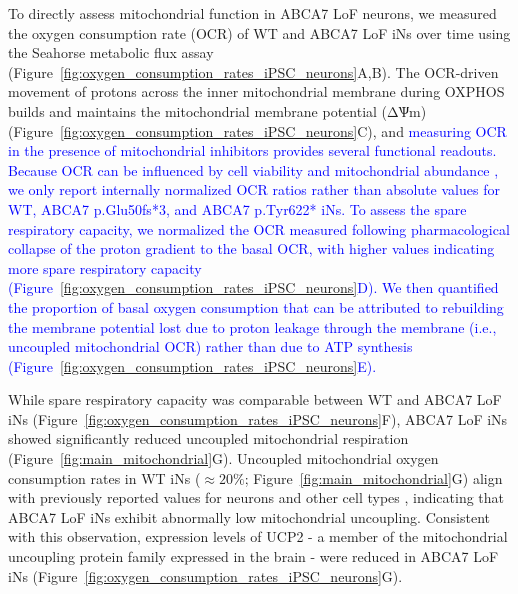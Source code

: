 To directly assess mitochondrial function in ABCA7 LoF neurons, we measured the oxygen consumption rate (OCR) of WT and ABCA7 LoF iNs over time using the Seahorse metabolic flux assay (Figure~\ref{fig:oxygen_consumption_rates_iPSC_neurons}A,B). The OCR-driven movement of protons across the inner mitochondrial membrane during OXPHOS builds and maintains the mitochondrial membrane potential (ΔѰm)(Figure~\ref{fig:oxygen_consumption_rates_iPSC_neurons}C), and  \newcommand{\quoteC}{\textcolor{blue}{measuring OCR in the presence of mitochondrial inhibitors provides several functional readouts. Because OCR can be influenced by cell viability and mitochondrial abundance \cite{Divakaruni2014-eq,Gu2021-ms}, we only report internally normalized OCR ratios rather than absolute values \cite{Divakaruni2022-bp} for WT, ABCA7 p.Glu50fs*3, and ABCA7 p.Tyr622* iNs. To assess the spare respiratory capacity, we normalized the OCR measured following pharmacological collapse of the proton gradient to the basal OCR, with higher values indicating more spare respiratory capacity \cite{Divakaruni2022-bp} (Figure~\ref{fig:oxygen_consumption_rates_iPSC_neurons}D). We then quantified the proportion of basal oxygen consumption that can be attributed to rebuilding the membrane potential lost due to proton leakage through the membrane (i.e., uncoupled mitochondrial OCR) rather than due to ATP synthesis \cite{Divakaruni2022-bp} (Figure~\ref{fig:oxygen_consumption_rates_iPSC_neurons}E).\label{quoteC-label}}}
\quoteC

While spare respiratory capacity was comparable between WT and ABCA7 LoF iNs (Figure~\ref{fig:oxygen_consumption_rates_iPSC_neurons}F), ABCA7 LoF iNs showed significantly reduced uncoupled mitochondrial respiration (Figure~\ref{fig:main_mitochondrial}G). Uncoupled mitochondrial oxygen consumption rates in WT iNs ($\approx 20\%$; Figure~\ref{fig:main_mitochondrial}G) align with previously reported values for neurons and other cell types \cite{Divakaruni2011-uj,Jekabsons2004-fn,Jain2024-br}, indicating that ABCA7 LoF iNs exhibit abnormally low mitochondrial uncoupling. Consistent with this observation, expression levels of UCP2 - a member of the mitochondrial uncoupling protein family expressed in the brain \cite{Kumar2022-bb} - were reduced in ABCA7 LoF iNs (Figure~\ref{fig:oxygen_consumption_rates_iPSC_neurons}G). 

